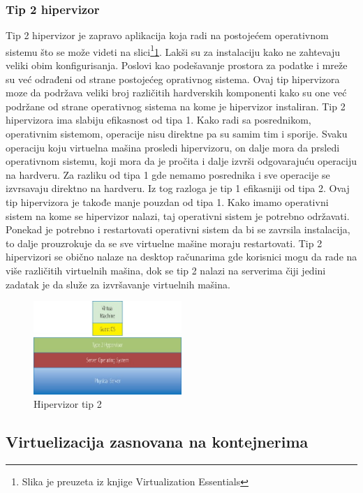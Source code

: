 \documentclass[12pt,oneside]{memoir}
\begin{document}
\subsubsection{Tip 2 hipervizor}
Tip 2 hipervizor je zapravo aplikacija koja radi na postojećem operativnom sistemu što se može videti na slici\footnote{Slika je preuzeta iz knjige Virtualization Essentials}\ref{fig:hipervizorTip2}. Lakši su za instalaciju kako ne zahtevaju veliki obim konfigurisanja. Poslovi kao podešavanje prostora za podatke i mreže su već odrađeni od strane postojećeg oprativnog sistema. Ovaj tip hipervizora moze da podržava veliki broj različitih hardverskih komponenti kako su one već podržane od strane operativnog sistema na kome je hipervizor instaliran. Tip 2 hipervizora ima slabiju efikasnost od tipa 1\cite{ve}. Kako radi sa posrednikom, operativnim sistemom, operacije nisu direktne pa su samim tim i sporije. Svaku operaciju koju virtuelna mašina prosledi hipervizoru, on dalje mora da prsledi operativnom sistemu, koji mora da je pročita i dalje izvrši odgovarajuću operaciju na hardveru. Za razliku od tipa 1 gde nemamo posrednika i sve operacije se izvrsavaju direktno na hardveru. Iz tog razloga je tip 1 efikasniji od tipa 2. 
Ovaj tip hipervizora je takođe manje pouzdan od tipa 1. Kako imamo operativni sistem na kome se hipervizor nalazi, taj operativni sistem je potrebno održavati. Ponekad je potrebno i restartovati operativni sistem da bi se zavrsila instalacija, to dalje prouzrokuje da se sve virtuelne mašine moraju restartovati. Tip 2 hipervizori se obično nalaze na desktop računarima gde korisnici mogu da rade na više različitih virtuelnih mašina, dok se tip 2 nalazi na serverima čiji jedini zadatak je da služe za izvršavanje virtuelnih mašina.

\begin{figure}[!ht]
  \centering
  \includegraphics[width=0.5\textwidth]{Slika 3.jpg}
  \caption{Hipervizor tip 2}
  \label{fig:hipervizorTip2}
\end{figure}

 
\subsection{Virtuelizacija zasnovana na kontejnerima}
\end{document}

